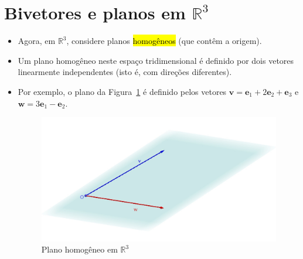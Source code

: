 \documentclass[
  letterpaper,
  DIV=11,
  numbers=noendperiod]{scrreprt}
\begin{document}
\hypertarget{bivetores-e-planos-em-mathbbr3}{%
\section{\texorpdfstring{Bivetores e planos em
$\mathbb{R}^3$}{Bivetores e planos em }}\label{bivetores-e-planos-em-mathbbr3}}

\begin{itemize}
\item
  Agora, em $\mathbb{R}^3$, considere planos {\hl{homogêneos}} (que
  contêm a origem).
\item
  Um plano homogêneo neste espaço tridimensional é definido por dois
  vetores linearmente independentes (isto é, com direções diferentes).
\item
  Por exemplo, o plano da Figura~\ref{fig-plano} é definido pelos
  vetores
  $\mathbf{v} = \mathbf{e}_{1} + 2\mathbf{e}_{2} + \mathbf{e}_{3}$ e
  $\mathbf{w} = 3\mathbf{e}_{1} - \mathbf{e}_{2}$.

  \begin{figure}[t]

  {\centering \includegraphics[width=1\textwidth,height=\textheight]{figures/plano.jpg}

  }

  \caption{\label{fig-plano}Plano homogêneo em $\mathbb{R}^3$}


\end{figure}
\end{itemize}
\end{document}

